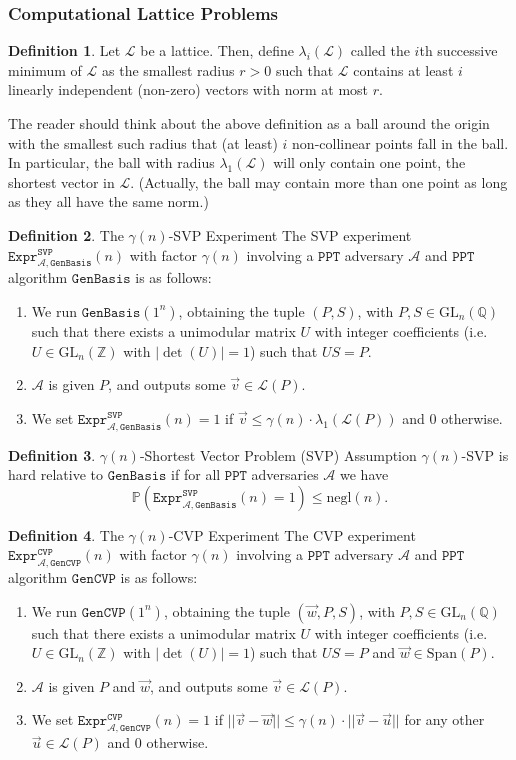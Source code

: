 \documentclass{article}
\theoremstyle{definition}
\newtheorem{definition}{Definition}[section]
\theoremstyle{example}
\newcommand{\A}{\mathcal{A}}
\renewcommand{\L}{\mathcal{L}}
\newcommand{\Prob}{\mathbb{P}}
\newcommand{\Int}{\mathbb{Z}}
\newcommand{\Rat}{\mathbb{Q}}
\newcommand{\GL}{\text{GL}}
\newcommand{\Span}{\text{Span}}
\newcommand{\PPT}{\texttt{PPT}}
\newcommand{\negl}{\text{negl}}
\newcommand{\Expr}[2]{\texttt{Expr}^{\texttt{#1}}_{#2}}
\newcommand{\GenBasis}{\texttt{GenBasis}}
\newcommand{\GenCVP}{\texttt{GenCVP}}
\newcommand{\norm}[1]{||#1||}
\begin{document}
\subsubsection{Computational Lattice Problems}
\label{sec:comp_lattice_prob}
\begin{definition}
  Let $\L$ be a lattice. Then, define $\lambda_i(\L)$ called the $i$th
  successive minimum of $\L$ as the smallest radius $r > 0 $ such that $\L$
  contains at least $i$ linearly independent (non-zero) vectors with norm at most $r$.
\end{definition}
The reader should think about the above definition as a ball around the origin
with the smallest such radius that (at least) $i$ non-collinear points fall in
the ball. In particular, the ball with radius $\lambda_1(\L)$ will only contain
one point, the shortest vector in $\L$. (Actually, the ball may contain more
than one point as long as they all have the same norm.)
\begin{definition}{The $\gamma(n)$-SVP Experiment} The SVP experiment
  $\Expr{SVP}{\A, \GenBasis}(n)$ with factor $\gamma(n)$ involving a $\PPT$ adversary $\A$ and
  $\PPT$ algorithm $\GenBasis$ is as follows:
  \begin{enumerate}
  \item We run $\GenBasis(1^n)$, obtaining the tuple $(P, S)$, with $P, S \in
    \GL_n(\Rat)$ such that there exists a unimodular matrix $U$ with integer
    coefficients (i.e. $U \in \GL_n(\Int)$ with $|\det(U)| = 1$) such that $US =
    P$.
  \item $\A$ is given $P$, and outputs some $\vec{v} \in \L(P)$.
  \item We set $\Expr{SVP}{\A, \GenBasis}(n) = 1$ if $\vec{v} \leq \gamma(n)
    \cdot \lambda_1(\L(P))$ and $0$ otherwise.
  \end{enumerate}
\end{definition}
\begin{definition}{$\gamma(n)$-Shortest Vector Problem (SVP) Assumption}
  $\gamma(n)$-SVP is hard relative to $\GenBasis$ if for all $\PPT$ adversaries $\A$ we
  have
  \[
    \Prob(\Expr{SVP}{\A, \GenBasis}(n) = 1) \leq \negl(n).
  \]
\end{definition}
\begin{definition}{The $\gamma(n)$-CVP Experiment} The CVP experiment
  $\Expr{CVP}{\A, \GenCVP}(n)$ with factor $\gamma(n)$ involving a $\PPT$ adversary $\A$ and
  $\PPT$ algorithm $\GenCVP$ is as follows:
  \begin{enumerate}
  \item We run $\GenCVP(1^n)$, obtaining the tuple $(\vec{w}, P, S)$, with $P, S \in
    \GL_n(\Rat)$ such that there exists a unimodular matrix $U$ with integer
    coefficients (i.e. $U \in \GL_n(\Int)$ with $|\det(U)| = 1$) such that $US =
    P$ and $\vec{w} \in \Span(P)$.
  \item $\A$ is given $P$ and $\vec{w}$, and outputs some $\vec{v} \in \L(P)$.
  \item We set $\Expr{CVP}{\A, \GenCVP}(n) = 1$ if $\norm{\vec{v} - \vec{w}} \leq \gamma(n)
    \cdot \norm{\vec{v} - \vec{u}}$ for any other $\vec{u} \in \L(P)$ and $0$ otherwise.
  \end{enumerate}
\end{definition}
\end{document}
